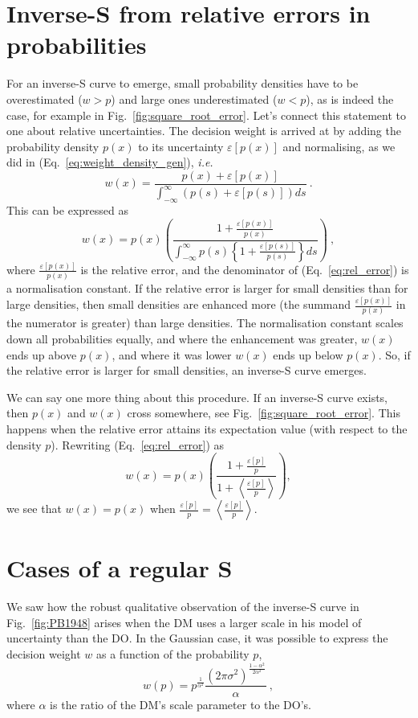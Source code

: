 \documentclass[a4paper, 12pt]{article}
\newcommand{\ave}[1]{\left\langle#1 \right\rangle}
\newcommand{\elabel}[1]{\label{eq:#1}}
\newcommand{\eref}[1]{(Eq.~\ref{eq:#1})}
\newcommand{\fref}[1]{Fig.~\ref{fig:#1}}
\newcommand{\seclabel}[1]{\label{sec:#1}}
\newcommand{\ie}{\textit{i.e.}\xspace}
\newcommand{\be}{\begin{equation}}
\newcommand{\ee}{\end{equation}}
\newcommand{\err}[1]{\varepsilon\left[#1\right]}
\begin{document}
\newpage
\printbibliography

\appendix

\newpage
\section{Inverse-S from relative errors in probabilities}
\seclabel{relative_errors}

For an inverse-S curve to emerge, small probability densities have to be overestimated ($w>p$) and large ones underestimated ($w<p$), as is indeed the case, for example in \fref{square_root_error}. Let's connect this statement to one about relative uncertainties. The decision weight is arrived at by adding the probability density $p(x)$ to its uncertainty $\err{p(x)}$ and normalising, as we did in \eref{weight_density_gen}, \ie
\be
w(x)=\frac{p(x)+\err{p(x)}}{\int_{-\infty}^{\infty} \left( p(s)+\err{p(s)} \right) ds}~.
\ee
This can be expressed as
\be
w(x)=p(x) \left(\frac{1+\frac{\err{p(x)}}{p(x)}}{\int_{-\infty}^{\infty} p(s)\left\{1+\frac{\err{p(s)}}{p(s)}\right\} ds}\right)~,
\elabel{rel_error}
\ee
where $\frac{\err{p(x)}}{p(x)}$ is the relative error, and the denominator of \eref{rel_error} is a normalisation constant. If the relative error is larger for small densities than for large densities, then small densities are enhanced more (the summand $\frac{\err{p(x)}}{p(x)}$ in the numerator is greater) than large densities. The normalisation constant scales down all probabilities equally, and where the enhancement was greater, $w(x)$ ends up above $p(x)$, and where it was lower $w(x)$ ends up below $p(x)$. So, if the relative error is larger for small densities, an inverse-S curve emerges.

We can say one more thing about this procedure. If an inverse-S curve exists, then $p(x)$ and $w(x)$ cross somewhere, see \fref{square_root_error}. This happens when the relative error attains its expectation value (with respect to the density $p$). Rewriting \eref{rel_error} as
\be
w(x)=p(x) \left(\frac{1+\frac{\err{p}}{p}}{1+\ave{\frac{\err{p}}{p}}}\right),
\ee
we see that $w(x)=p(x)$ when $\frac{\err{p}}{p}=\ave{\frac{\err{p}}{p}}.$

\newpage
\section{Cases of a regular S}
\seclabel{Scurve}

We saw how the robust qualitative observation of the inverse-S curve in \fref{PB1948} arises when the DM uses a larger scale in his model of uncertainty than the DO. In the Gaussian case, it was possible to express the decision weight $w$ as a function of the probability $p$,
\be
w(p)= p^{\frac{1}{\alpha^2}} \frac{\left(2\pi\sigma^2\right)^{\frac{1-\alpha^2}{2\alpha^2}}}{\alpha} ~,
\ee
where $\alpha$ is the ratio of the DM's scale parameter to the DO's.
\end{document}
